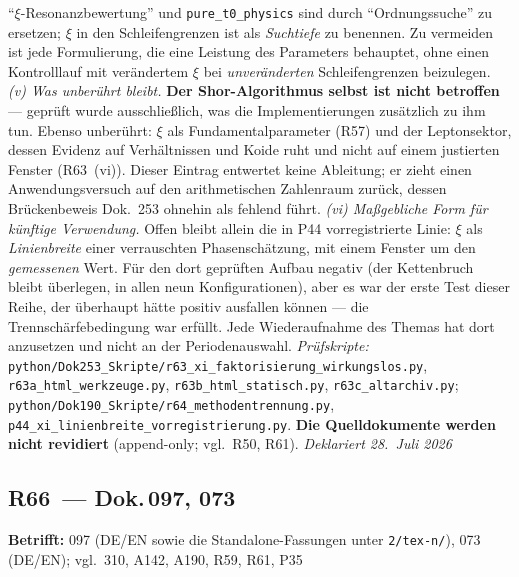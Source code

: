 \enquote{$\xi$-Resonanzbewertung} und \texttt{pure\_t0\_physics} sind
durch \enquote{Ordnungssuche} zu ersetzen; $\xi$ in den Schleifengrenzen
ist als \emph{Suchtiefe} zu benennen. Zu vermeiden ist jede
Formulierung, die eine Leistung des Parameters behauptet, ohne einen
Kontrolllauf mit verändertem $\xi$ bei \emph{unveränderten}
Schleifengrenzen beizulegen.
\emph{(v) Was unberührt bleibt.} \textbf{Der Shor-Algorithmus selbst ist
nicht betroffen} --- geprüft wurde ausschließlich, was die
Implementierungen zusätzlich zu ihm tun. Ebenso unberührt: $\xi$ als
Fundamentalparameter (R57) und der Leptonsektor, dessen Evidenz auf
Verhältnissen und Koide ruht und nicht auf einem justierten Fenster
(R63~(vi)). Dieser Eintrag entwertet keine Ableitung; er zieht einen
Anwendungsversuch auf den arithmetischen Zahlenraum zurück, dessen
Brückenbeweis Dok.~253 ohnehin als fehlend führt.
\emph{(vi) Maßgebliche Form für künftige Verwendung.} Offen bleibt
allein die in P44 vorregistrierte Linie: $\xi$ als \emph{Linienbreite}
einer verrauschten Phasenschätzung, mit einem Fenster um den
\emph{gemessenen} Wert. Für den dort geprüften Aufbau negativ (der
Kettenbruch bleibt überlegen, in allen neun Konfigurationen), aber es
war der erste Test dieser Reihe, der überhaupt hätte positiv ausfallen
können --- die Trennschärfebedingung war erfüllt. Jede Wiederaufnahme
des Themas hat dort anzusetzen und nicht an der Periodenauswahl.
\emph{Prüfskripte:}
\texttt{python/\allowbreak Dok253\_\allowbreak Skripte/\allowbreak r63\_\allowbreak xi\_\allowbreak faktorisierung\_\allowbreak wirkungslos.py},
\texttt{r63a\_\allowbreak html\_\allowbreak werkzeuge.py},
\texttt{r63b\_\allowbreak html\_\allowbreak statisch.py},
\texttt{r63c\_\allowbreak altarchiv.py};
\texttt{python/\allowbreak Dok190\_\allowbreak Skripte/\allowbreak r64\_\allowbreak methodentrennung.py},
\texttt{p44\_\allowbreak xi\_\allowbreak linienbreite\_\allowbreak vorregistrierung.py}.
\textbf{Die Quelldokumente werden nicht revidiert}
(append-only; vgl.\ R50, R61). \emph{Deklariert 28.~Juli 2026}

\medskip

\subsection*{R66~--- Dok.\,097, 073}

\noindent\textbf{Betrifft:} 097 (DE/EN sowie die Standalone-Fassungen unter
\texttt{2/tex-n/}), 073 (DE/EN); vgl.\ 310, A142, A190, R59, R61, P35

